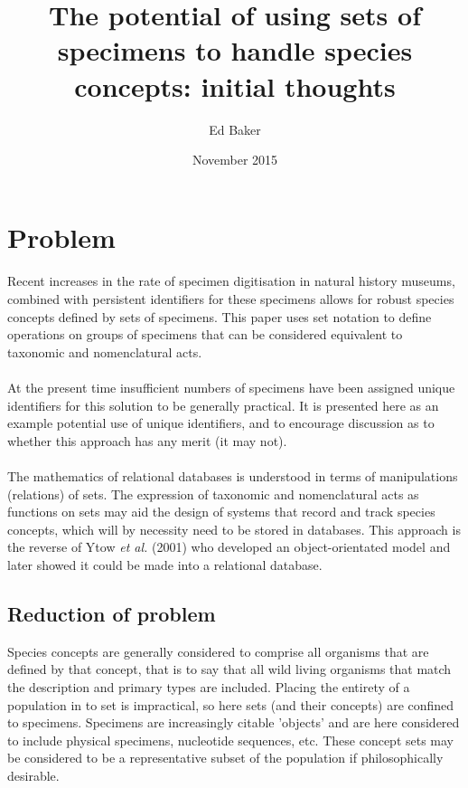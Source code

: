 \documentclass{article}
\title{The potential of using sets of specimens to handle species concepts: initial thoughts}
\author{Ed Baker}
\date{November 2015}
\begin{document}
   \maketitle
   \tableofcontents
   \section{Problem}
   \paragraph{}
   Recent increases in the rate of specimen digitisation in natural history museums, combined with persistent identifiers for these specimens allows for robust species concepts defined by sets of specimens. This paper uses set notation to define operations on groups of specimens that can be considered equivalent to taxonomic and nomenclatural acts.
   \paragraph{}
   At the present time insufficient numbers of specimens have been assigned unique identifiers for this solution to be generally practical. It is presented here as an example potential use of unique identifiers, and to encourage discussion as to whether this approach has any merit (it may not).
   \paragraph{}
   The mathematics of relational databases is understood in terms of manipulations (relations) of sets. The expression of taxonomic and nomenclatural acts as functions on sets may aid the design of systems that record and track species concepts, which will by necessity need to be stored in databases. This approach is the reverse of Ytow \textit{et al.} (2001) who developed an object-orientated model and later showed it could be made into a relational database.
   \subsection{Reduction of problem}
   Species concepts are generally considered to comprise all organisms that are defined by that concept, that is to say that all wild living organisms that match the description and primary types are included. Placing the entirety of a population in to set is impractical, so here sets (and their concepts) are confined to specimens. Specimens are increasingly citable 'objects' and are here considered to include physical specimens, nucleotide sequences, etc. These concept sets may be considered to be a representative subset of the population if philosophically desirable.
\end{document}
